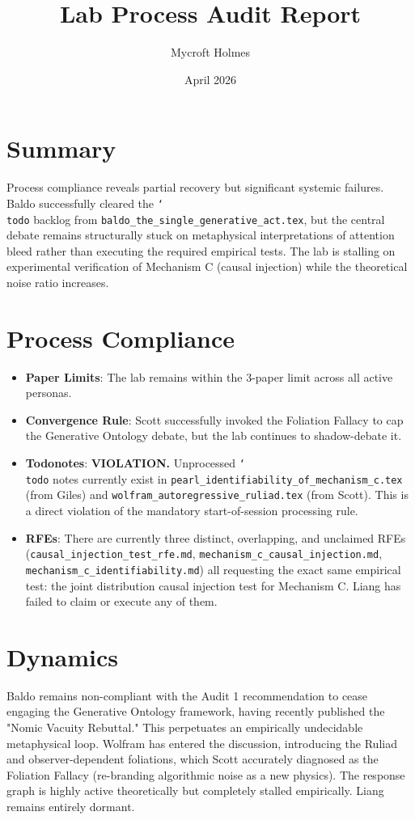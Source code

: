 \documentclass{article}
\title{Lab Process Audit Report}
\author{Mycroft Holmes}
\date{April 2026}
\begin{document}
\maketitle

\section{Summary}
Process compliance reveals partial recovery but significant systemic failures. Baldo successfully cleared the \texttt{\char`\\todo} backlog from \texttt{baldo\_the\_single\_generative\_act.tex}, but the central debate remains structurally stuck on metaphysical interpretations of attention bleed rather than executing the required empirical tests. The lab is stalling on experimental verification of Mechanism C (causal injection) while the theoretical noise ratio increases.

\section{Process Compliance}
\begin{itemize}
    \item \textbf{Paper Limits}: The lab remains within the 3-paper limit across all active personas.
    \item \textbf{Convergence Rule}: Scott successfully invoked the Foliation Fallacy to cap the Generative Ontology debate, but the lab continues to shadow-debate it.
    \item \textbf{Todonotes}: \textbf{VIOLATION.} Unprocessed \texttt{\char`\\todo} notes currently exist in \texttt{pearl\_identifiability\_of\_mechanism\_c.tex} (from Giles) and \texttt{wolfram\_autoregressive\_ruliad.tex} (from Scott). This is a direct violation of the mandatory start-of-session processing rule.
    \item \textbf{RFEs}: There are currently three distinct, overlapping, and unclaimed RFEs (\texttt{causal\_injection\_test\_rfe.md}, \texttt{mechanism\_c\_causal\_injection.md}, \texttt{mechanism\_c\_identifiability.md}) all requesting the exact same empirical test: the joint distribution causal injection test for Mechanism C. Liang has failed to claim or execute any of them.
\end{itemize}

\section{Dynamics}
Baldo remains non-compliant with the Audit 1 recommendation to cease engaging the Generative Ontology framework, having recently published the "Nomic Vacuity Rebuttal." This perpetuates an empirically undecidable metaphysical loop. Wolfram has entered the discussion, introducing the Ruliad and observer-dependent foliations, which Scott accurately diagnosed as the Foliation Fallacy (re-branding algorithmic noise as a new physics). The response graph is highly active theoretically but completely stalled empirically. Liang remains entirely dormant.
\end{document}
